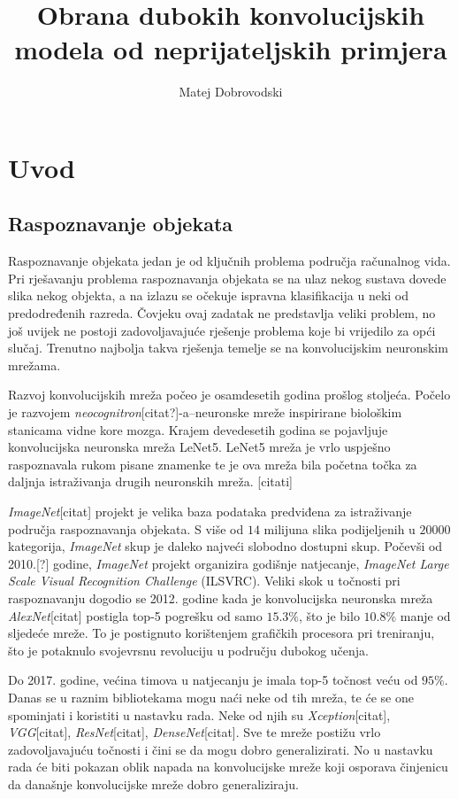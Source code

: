 \documentclass[utf8, diplomski]{fer}
\begin{document}

\title{Obrana dubokih konvolucijskih modela od neprijateljskih primjera}

\author{Matej Dobrovodski}

\maketitle

\iffalse  \fi

\tableofcontents

\chapter{Uvod}
\section{Raspoznavanje objekata}
Raspoznavanje objekata jedan je od ključnih problema područja računalnog vida. Pri rješavanju problema raspoznavanja objekata se na ulaz nekog sustava dovede slika nekog objekta, a na izlazu se očekuje ispravna klasifikacija u neki od predodređenih razreda. Čovjeku ovaj zadatak ne predstavlja veliki problem, no još uvijek ne postoji zadovoljavajuće rješenje problema koje bi vrijedilo za opći slučaj. Trenutno najbolja takva rješenja temelje se na konvolucijskim neuronskim mrežama. \par
Razvoj konvolucijskih mreža počeo je osamdesetih godina prošlog stoljeća. Počelo je razvojem \textit{neocognitron}[citat?]-a--neuronske mreže inspirirane biološkim stanicama vidne kore mozga. Krajem devedesetih godina se pojavljuje konvolucijska neuronska mreža LeNet5. LeNet5 mreža je vrlo uspješno raspoznavala rukom pisane znamenke te je ova mreža bila početna točka za daljnja istraživanja drugih neuronskih mreža. [citati] \par
\textit{ImageNet}[citat] projekt je velika baza podataka predviđena za istraživanje područja raspoznavanja objekata. S više od $14$ milijuna slika podijeljenih u $20000$ kategorija, \textit{ImageNet} skup je daleko najveći slobodno dostupni skup. Počevši od 2010.[?] godine, \textit{ImageNet} projekt organizira godišnje natjecanje, \textit{ImageNet Large Scale Visual Recognition Challenge} (ILSVRC). Veliki skok u točnosti pri raspoznavanju dogodio se 2012. godine kada je konvolucijska neuronska mreža \textit{AlexNet}[citat] postigla top-5 pogrešku od samo $15.3\%$, što je bilo $10.8\%$ manje od sljedeće mreže. To je postignuto korištenjem grafičkih procesora pri treniranju, što je potaknulo svojevrsnu revoluciju u području dubokog učenja. \par
Do 2017. godine, većina timova u natjecanju je imala top-5 točnost veću od $95\%$. Danas se u raznim bibliotekama mogu naći neke od tih mreža, te će se one spominjati i koristiti u nastavku rada. Neke od njih su \textit{Xception}[citat], \textit{VGG}[citat], \textit{ResNet}[citat], \textit{DenseNet}[citat]. Sve te mreže postižu vrlo zadovoljavajuću točnosti i čini se da mogu dobro generalizirati. No u nastavku rada će biti pokazan oblik napada na konvolucijske mreže koji osporava činjenicu da današnje konvolucijske mreže dobro generaliziraju.
\end{document}

